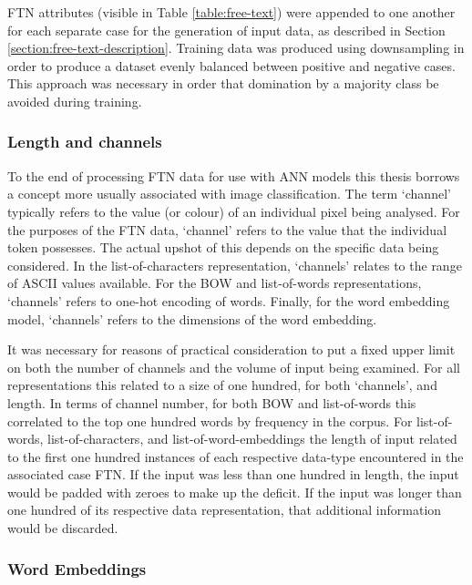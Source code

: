 FTN attributes (visible in Table \ref{table:free-text}) were appended to one another for each separate case for the generation of input data, as described in Section \ref{section:free-text-description}. Training data was produced using downsampling in order to produce a dataset evenly balanced between positive and negative cases. This approach was necessary in order that domination by a majority class be avoided during training. 

\subsubsection{Length and channels}

To the end of processing FTN data for use with ANN models this thesis borrows a concept more usually associated with image classification. The term `channel' typically refers to the value (or colour) of an individual pixel being analysed. For the purposes of the FTN data, `channel' refers to the value that the individual token possesses. The actual upshot of this depends on the specific data being considered. In the list-of-characters representation, `channels' relates to the range of ASCII values available. For the BOW and list-of-words representations, `channels' refers to one-hot encoding of words. Finally, for the word embedding model, `channels' refers to the dimensions of the word embedding. 

It was necessary for reasons of practical consideration to put a fixed upper limit on both the number of channels and the volume of input being examined. For all representations this related to a size of one hundred, for both `channels', and length. In terms of channel number, for both BOW and list-of-words this correlated to the top one hundred words by frequency in the corpus. For list-of-words, list-of-characters, and list-of-word-embeddings the length of input related to the first one hundred instances of each respective data-type encountered in the associated case FTN. If the input was less than one hundred in length, the input would be padded with zeroes to make up the deficit. If the input was longer than one hundred of its respective data representation, that additional information would be discarded. 

\subsubsection{Word Embeddings}

